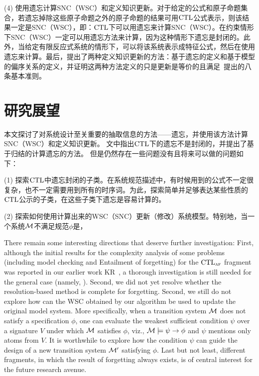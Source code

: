 (4) 使用遗忘计算SNC（WSC）和定义知识更新。对于给定的公式和原子命题集合，若遗忘掉除这些原子命题之外的原子命题的结果可用$\textrm{CTL}$公式表示，则该结果一定是SNC（WSC），即：$\textrm{CTL}$下可以用遗忘来计算SNC（WSC）。在约束情形下SNC（WSC）一定可以用遗忘方法来计算，因为这种情形下遗忘是封闭的。此外，当给定有限反应式系统的情形下，可以将该系统表示成特征公式，然后在使用遗忘来计算。最后，提出了两种定义知识更新的方法：基于遗忘的定义和基于模型的偏序关系的定义，并证明这两种方法定义的只是更新是等价的且满足~\citeauthor{katsuno91mendelzon}提出的八条基本准则。




\section{研究展望}
本文探讨了对系统设计至关重要的抽取信息的方法——遗忘，并使用该方法计算SNC（WSC）和定义知识更新。
文中指出$\textrm{CTL}$下的遗忘不是封闭的，并提出了基于归结的计算遗忘的方法。
但是仍然存在一些问题没有且将来可以做的问题如下：

(1) 探索$\textrm{CTL}$中遗忘封闭的子类。在系统规范描述中，有时候用到的公式不一定很复杂，也不一定需要用到所有的时序词。为此，探索简单并足够表达某些性质的$\textrm{CTL}$公示的子类，在这些子类下遗忘是容易计算的。

(2) 探索如何使用计算出来的WSC（SNC）更新（修改）系统模型。特别地，当一个系统$\cal M$不满足规范$\phi$是，

There remain some interesting directions that deserve further investigation: First, although the initial results for the  complexity analysis of some problems (including model checking and  Entailment of forgetting) for the $\textrm{CTL}_{\textsc{a}\textsc{f}}$ fragment was reported in our earlier work  KR~\cite{renyansfirstpaper}, a thorough investigation is still needed for the general case (namely, \CTL). Second, we did not yet resolve whether the resolution-based method is complete for forgetting. Second, we still do not explore how can the WSC obtained by our algorithm be used to update the original model system.
More specifically, when a transition system $\cal M$ does not satisfy a specification $\phi$, one can evaluate the weakest sufficient condition  $\psi$ over a signature $V$ under which ${\cal M}$ satisfies $\phi$, viz., ${\cal M}\models\psi\rightarrow \phi$ and $\psi$ mentions only atoms from $V$. It is worthwhile to explore how the condition $\psi$ can guide the design of a new transition system ${\cal M}'$ satisfying $\phi$.
Last but not least, different fragments, in which the result of forgetting always exists, is of central interest for the future research avenue.


